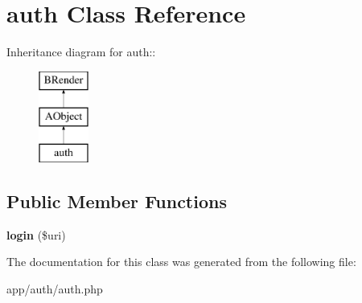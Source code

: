 \section{auth Class Reference}
\label{classauth}
Inheritance diagram for auth::\begin{figure}[H]
\begin{center}
\leavevmode
\includegraphics[height=3cm]{classauth}
\end{center}
\end{figure}
\subsection*{Public Member Functions}
\begin{DoxyCompactItemize}
\item 
{\bfseries login} (\$uri)\label{classauth_a97f8ba364b11d423b613066e13a53a50}

\end{DoxyCompactItemize}


The documentation for this class was generated from the following file:\begin{DoxyCompactItemize}
\item 
app/auth/auth.php\end{DoxyCompactItemize}
